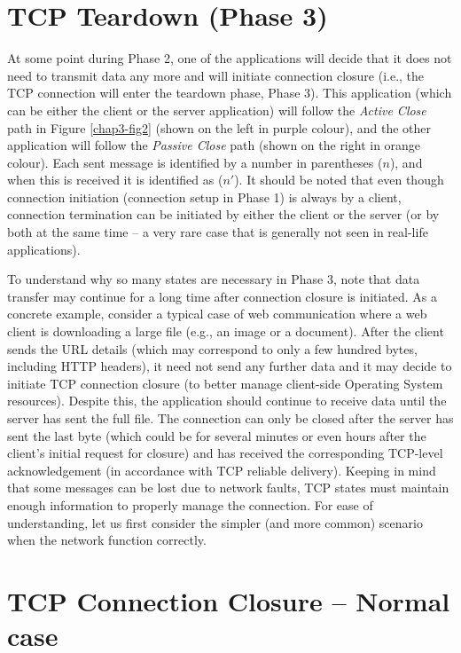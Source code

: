 \begin{multicols}{2}
\section*{TCP Teardown (Phase 3)}

At some point during Phase 2, one of the applications will decide that it does not need to transmit data any more and will initiate connection closure (i.e., the TCP connection will enter the teardown phase, Phase 3). This application (which can be either the client or the server application) will follow the \textit{Active Close} path in Figure \ref{chap3-fig2} (shown on the left in purple colour), and the other application will follow the \textit{Passive Close} path (shown on the right in orange colour). Each sent message is identified by a number in parentheses ($n$), and when this is received it is identified as ($n'$). It should be noted that even though connection initiation (connection setup in Phase 1) is always by a client, connection termination can be initiated by either the client or the server (or by both at the same time -- a very rare case that is generally not seen in real-life applications).

To understand why so many states are necessary in Phase 3, note that data transfer may continue for a long time after connection closure is initiated. As a concrete example, consider a typical case of web communication where a web client is downloading a large file (e.g., an image or a document). After the client sends the URL details (which may correspond to only a few hundred bytes, including HTTP headers), it need not send any further data and it may decide to initiate TCP connection closure (to better manage client-side Operating System resources). Despite this, the application should continue to receive data until the server has sent the full file. The connection can only be closed after the server has sent the last byte (which could be for several minutes or even hours after the client’s initial request for closure) and has received the corresponding TCP-level acknowledgement (in accordance with TCP reliable delivery). Keeping in mind that some messages can be lost due to network faults, TCP states must maintain enough information to properly manage the connection. For ease of understanding, let us first consider the simpler (and more common) scenario when the network function correctly.

\section*{TCP Connection Closure -- Normal case}


\end{multicols}
